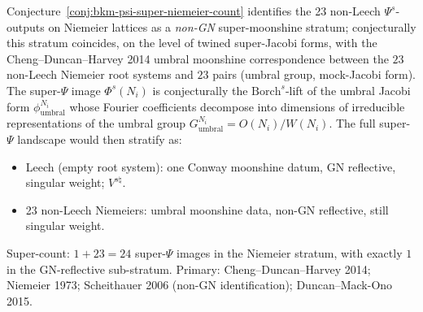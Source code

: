 \begin{remark}
\label{rem:bkm-super-umbral-bridge}
Conjecture~\ref{conj:bkm-psi-super-niemeier-count} identifies the
23 non-Leech $\Psi^{s}$-outputs on Niemeier lattices as a
\emph{non-GN} super-moonshine stratum; conjecturally this stratum
coincides, on the level of twined super-Jacobi forms, with the
Cheng--Duncan--Harvey 2014 umbral moonshine correspondence
between the $23$ non-Leech Niemeier root systems and $23$
pairs (umbral group, mock-Jacobi form). The super-$\Psi$ image
$\Phi^{s}(N_{i})$ is conjecturally the $\mathrm{Borch}^{s}$-lift
of the umbral Jacobi form $\phi^{N_{i}}_{\mathrm{umbral}}$ whose
Fourier coefficients decompose into dimensions of irreducible
representations of the umbral group
$G^{N_{i}}_{\mathrm{umbral}} = O(N_{i})/W(N_{i})$. The full
super-$\Psi$ landscape would then stratify as:
\begin{itemize}
\item Leech (empty root system): one Conway moonshine datum, GN
reflective, singular weight; $V^{s\natural}$.
\item 23 non-Leech Niemeiers: umbral moonshine data, non-GN
reflective, still singular weight.
\end{itemize}
Super-count: $1 + 23 = 24$ super-$\Psi$ images in the Niemeier
stratum, with exactly $1$ in the GN-reflective sub-stratum.
Primary: Cheng--Duncan--Harvey 2014; Niemeier 1973; Scheithauer 2006
(non-GN identification); Duncan--Mack-Ono 2015.
\end{remark}

